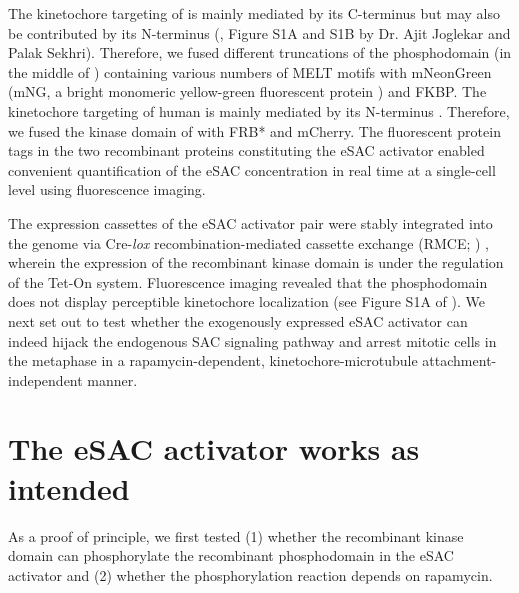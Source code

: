 The kinetochore targeting of  is mainly mediated by its C-terminus \cite{KNL1CTer_Kiyomitsu2007, Screpanti2011, Knl1CTer, MIS12CStructure_Petrovic2016, Spc105pCTer-MIND_Maskell2010} but may also be contributed by its N-terminus (\cite{eSAC}, Figure S1A and S1B by Dr. Ajit Joglekar and Palak Sekhri). Therefore, we fused different truncations of the  phosphodomain (in the middle of ) containing various numbers of MELT motifs with mNeonGreen (mNG, a bright monomeric yellow-green fluorescent protein \cite{mNG}) and FKBP. The kinetochore targeting of human  is mainly mediated by its N-terminus \cite{MPS1Localization_Ji, MPS1Localization_Hiruma, Mps1_Aravamudhan}. Therefore, we fused the kinase domain of  with FRB* \cite{FRB_T2098L} and mCherry. The fluorescent protein tags in the two recombinant proteins constituting the eSAC activator enabled convenient quantification of the eSAC concentration in real time at a single-cell level using fluorescence imaging.

The expression cassettes of the eSAC activator pair were stably integrated into the genome via Cre-\textit{lox} recombination-mediated cassette exchange (RMCE; ) \cite{HeLa-A12_Khandelia2011, HeLa-A12_Ballister2014}, wherein the expression of the recombinant  kinase domain is under the regulation of the Tet-On system. Fluorescence imaging revealed that the  phosphodomain does not display perceptible kinetochore localization (see Figure S1A of \cite{eSAC}). We next set out to test whether the exogenously expressed eSAC activator can indeed hijack the endogenous SAC signaling pathway and arrest mitotic cells in the metaphase in a rapamycin-dependent, kinetochore-microtubule attachment-independent manner.

\section{The eSAC activator works as intended}

As a proof of principle, we first tested (1) whether the recombinant  kinase domain can phosphorylate the recombinant  phosphodomain in the eSAC activator and (2) whether the phosphorylation reaction depends on rapamycin.

